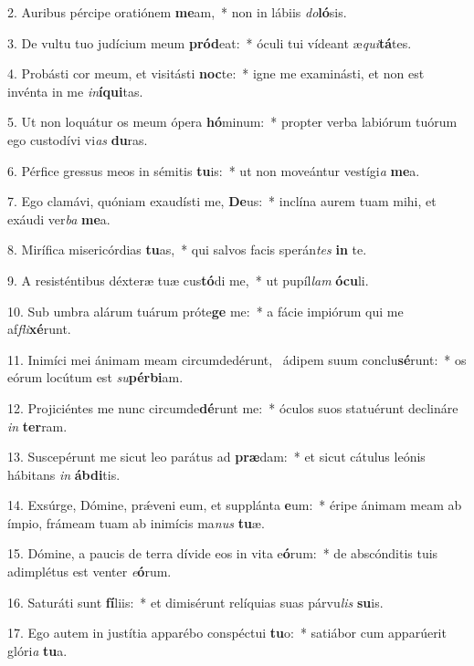 2. Auribus pércipe oratiónem \textbf{me}am,~*  non in lábiis \textit{do}\textbf{ló}sis.\

3. De vultu tuo judícium meum \textbf{pród}eat:~*  óculi tui vídeant æ\textit{qui}\textbf{tá}tes.\

4. Probásti cor meum, et visitásti \textbf{noc}te:~*  igne me examinásti, et non est invénta in me \textit{in}\textbf{í}\textbf{qui}tas.\

5. Ut non loquátur os meum ópera \textbf{hó}minum:~*  propter verba labiórum tuórum ego custodívi vi\textit{as} \textbf{du}ras.\

6. Pérfice gressus meos in sémitis \textbf{tu}is:~*  ut non moveántur vestígi\textit{a} \textbf{me}a.\

7. Ego clamávi, quóniam exaudísti me, \textbf{De}us:~*  inclína aurem tuam mihi, et exáudi ver\textit{ba} \textbf{me}a.\

8. Mirífica misericórdias \textbf{tu}as,~*  qui salvos facis sperán\textit{tes} \textbf{in} te.\

9. A resisténtibus déxteræ tuæ cus\textbf{tó}di me,~*  ut pupíl\textit{lam} \textbf{ó}\textbf{cu}li.\

10. Sub umbra alárum tuárum próte\textbf{ge} me:~*  a fácie impiórum qui me af\textit{fli}\textbf{xé}runt.\

11. Inimíci mei ánimam meam circumdedérunt, \dag\  ádipem suum conclu\textbf{sé}runt:~*  os eórum locútum est \textit{su}\textbf{pér}\textbf{bi}am.\

12. Projiciéntes me nunc circumde\textbf{dé}runt me:~*  óculos suos statuérunt declináre \textit{in} \textbf{ter}ram.\

13. Suscepérunt me sicut leo parátus ad \textbf{præ}dam:~*  et sicut cátulus leónis hábitans \textit{in} \textbf{áb}\textbf{di}tis.\

14. Exsúrge, Dómine, prǽveni eum, et supplánta \textbf{e}um:~*  éripe ánimam meam ab ímpio, frámeam tuam ab inimícis ma\textit{nus} \textbf{tu}æ.\

15. Dómine, a paucis de terra dívide eos in vita e\textbf{ó}rum:~*  de abscónditis tuis adimplétus est venter \textit{e}\textbf{ó}rum.\

16. Saturáti sunt \textbf{fí}liis:~*  et dimisérunt relíquias suas párvu\textit{lis} \textbf{su}is.\

17. Ego autem in justítia apparébo conspéctui \textbf{tu}o:~*  satiábor cum apparúerit glóri\textit{a} \textbf{tu}a.\

